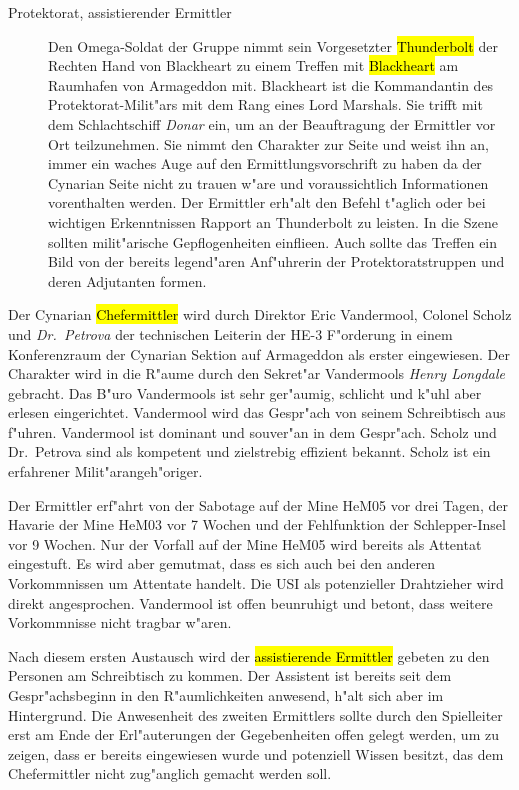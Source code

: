 \begin{description}
	\item [Protektorat, assistierender Ermittler] Den Omega-Soldat der Gruppe nimmt sein Vorgesetzter \hl{Thunderbolt} der Rechten Hand von 
		Blackheart zu einem Treffen mit \hl{Blackheart} am Raumhafen von Armageddon mit. Blackheart ist die Kommandantin des Protektorat-Milit"ars mit dem Rang eines Lord Marshals. Sie trifft mit dem Schlachtschiff \emph{Donar} ein, um an der Beauftragung der Ermittler vor Ort teilzunehmen. Sie nimmt den Charakter zur Seite und weist ihn an, immer ein waches Auge auf den Ermittlungsvorschrift zu haben da der Cynarian Seite nicht zu trauen w"are und voraussichtlich Informationen vorenthalten werden. Der Ermittler erh"alt den Befehl t"aglich oder bei wichtigen Erkenntnissen Rapport an Thunderbolt zu leisten. In die Szene sollten milit"arische Gepflogenheiten einflie\3en. Auch sollte das Treffen ein Bild von der bereits legend"aren Anf"uhrerin der Protektoratstruppen und deren Adjutanten formen.
\end{description}


Der Cynarian \hl{Chefermittler} wird durch Direktor Eric Vandermool, Colonel Scholz und \emph{Dr.~Petrova} der technischen Leiterin der HE-3 F"orderung in einem Konferenzraum der Cynarian Sektion auf Armageddon als erster eingewiesen. Der Charakter wird in die R"aume durch den Sekret"ar Vandermools \emph{Henry Longdale} gebracht. Das B"uro Vandermools ist sehr ger"aumig, schlicht und k"uhl aber erlesen eingerichtet. Vandermool wird das Gespr"ach von seinem Schreibtisch aus f"uhren. Vandermool ist dominant und souver"an in dem Gespr"ach. Scholz und Dr.~Petrova sind als kompetent und zielstrebig effizient bekannt. Scholz ist ein erfahrener Milit"arangeh"origer.

Der Ermittler erf"ahrt von der Sabotage auf der Mine HeM05 vor drei Tagen, der Havarie der Mine HeM03 vor 7 Wochen und der Fehlfunktion der Schlepper-Insel vor 9 Wochen. Nur der Vorfall auf der Mine HeM05 wird bereits als Attentat eingestuft. Es wird aber gemutma\3t, dass es sich auch bei den anderen Vorkommnissen um Attentate handelt. Die USI als potenzieller Drahtzieher wird direkt angesprochen. Vandermool ist offen beunruhigt und betont, dass weitere Vorkommnisse nicht tragbar w"aren. 

Nach diesem ersten Austausch wird der \hl{assistierende Ermittler} gebeten zu den Personen am Schreibtisch zu kommen. Der Assistent ist bereits seit dem Gespr"achsbeginn in den R"aumlichkeiten anwesend, h"alt sich aber im Hintergrund. Die Anwesenheit des zweiten Ermittlers sollte durch den Spielleiter  erst am Ende der Erl"auterungen der Gegebenheiten offen gelegt werden, um zu zeigen, dass er bereits eingewiesen wurde und potenziell Wissen besitzt, das dem Chefermittler nicht zug"anglich gemacht werden soll. 

